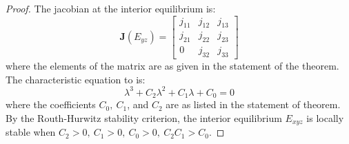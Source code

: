 \begin{proof}
    The jacobian at the interior equilibrium is:
    \begin{equation}\label{matrix:jacobian-interior}
        \textbf{J}\left(E_{yz}\right) = \begin{bmatrix}
            j_{11} & j_{12} & j_{13}\\
            j_{21} & j_{22} & j_{23}\\
            0 & j_{32} & j_{33}
        \end{bmatrix}
    \end{equation}
    where the elements of the matrix are as given in the statement of the theorem.
    The characteristic equation to  is:
    \begin{equation*}\label{eq:char-eq-interior}
        \lambda^3+C_2\lambda^2+C_1\lambda+C_0=0
    \end{equation*}
    where the coefficients $C_0,\ C_1$, and $C_2$ are as listed in the statement of theorem.
    By the Routh-Hurwitz stability criterion, the interior equilibrium $E_{xyz}$ is locally stable when $C_2>0,\ C_1>0,\ C_0>0,\ C_2C_1>C_0$.
\end{proof}
